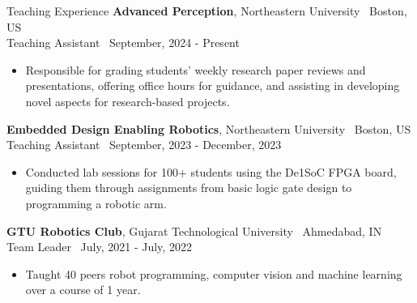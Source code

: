 \documentclass{resume}
\begin{document}
\begin{rSection}{Teaching Experience}
% 
{\bf Advanced Perception}{, Northeastern University} \hfill {\ {Boston, US}}\\
Teaching Assistant \hfill {\ September, 2024 - Present}
\begin{itemize}
  \item \vspace{-0.5em} Responsible for grading students’ weekly research paper reviews and presentations, offering office hours for guidance, and assisting in developing novel aspects for research-based projects.
 \vspace{-0.3em}
\end{itemize} 
{\bf Embedded Design Enabling Robotics}{, Northeastern University} \hfill {\ {Boston, US}}\\
Teaching Assistant \hfill {\ September, 2023 - December, 2023}
\begin{itemize}
  \item \vspace{-0.5em} Conducted lab sessions for 100+ students using the De1SoC FPGA board, guiding them through assignments from basic logic gate design to programming a robotic arm.
 \vspace{-0.3em}
\end{itemize} 

{\bf GTU Robotics Club}{, Gujarat Technological University} \hfill {\ {Ahmedabad, IN}}\\
Team Leader \hfill {\ July, 2021 - July, 2022}
\begin{itemize}
  \item \vspace{-0.5em} Taught 40 peers robot programming, computer vision and machine learning over a course of 1 year. \vspace{-0.3em}
\end{itemize} 

\end{rSection}
\end{document}
